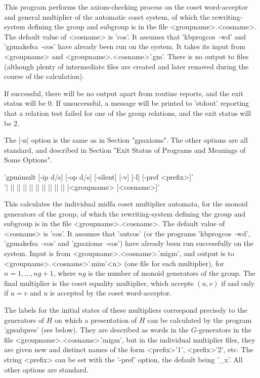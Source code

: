This program performs the axiom-checking process on the coset word-acceptor and
general multiplier of the automatic coset system, of which the
rewriting-system defining the group and subgroup is in the file
<groupname>.<cosname>. The default value of <cosname> is 'cos'.
It assumes that 'kbprogcos\ -wd' and 'gpmakefsa\ -cos' have already been run
on the system.
It takes its input from <groupname> and <groupname>.<cosname>'.gm'. 
There is no output to files (although plenty of intermediate files are
created and later removed during the course of the calculation).

If successful, there will be no output apart from routine reports, and the exit
status will be 0. If unsuccessful, a message will be printed to 'stdout'
reporting that a relation test failed for one of the group relations, and
the exit status will be 2.

The |-n| option is the same as in Section "gpaxioms".
The other options are all standard, and described in Section 
"Exit Status of Programs and Meanings of Some Options".

'gpmimult [-ip d/s] [-op d/s] [-silent] [-v] [-l] [-pref <prefix>]'\\
'| || || || || || || || || || |<groupname> [<cosname>]'

This calculates the individual midfa coset multiplier automata, for the monoid
generators of the group, of which the rewriting-system
defining the group and subgroup is in the file <groupname>.<cosname>.
The default value of <cosname> is 'cos'.
It assumes that 'autcos' (or the programs 'kbprogcos\ -wd', 'gpmakefsa\ -cos'
and 'gpaxioms\ -cos') have already been run successfully on the system.
Input is from <groupname>.<cosname>.'migm', and output is to
<groupname>.<cosname>'.mim'<n>
(one file for each multiplier), for $n = 1, \ldots , ng+1$, where $ng$ is
the number of monoid generators of the group. The final multiplier is
the coset equality multiplier, which accepts $(u,v)$ if and only if
$u = v$ and $u$ is accepted by the coset word-acceptor.

The labels for the initial states of these multipliers correspond
precisely to the generators of $H$ on which a presentation of $H$
can be calculated by the program 'gpsubpres' (see below). They are
described as words in the $G$-generators in the file
<groupname>.<cosname>.'migm', but in the individual multiplier
files, they are given new and distinct names of the form
<prefix>'1', <prefix>'2', etc.
The string <prefix> can be set with the '-pref' option, the
default being '\_x'. All other options are standard.

